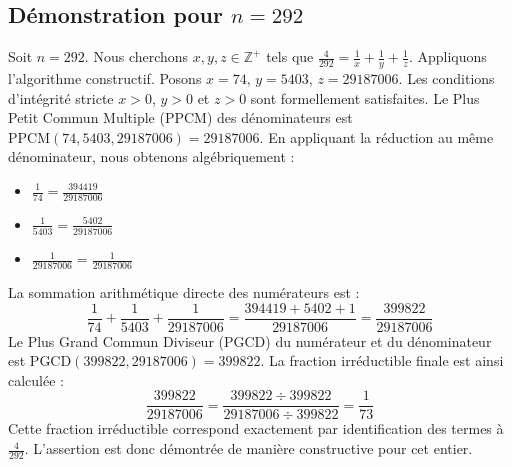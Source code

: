 \documentclass[11pt,a4paper]{article}
\begin{document}
\subsection{Démonstration pour $n = 292$}
Soit $n = 292$. Nous cherchons $x, y, z \in \mathbb{Z}^{+}$ tels que $\frac{4}{292} = \frac{1}{x} + \frac{1}{y} + \frac{1}{z}$.
Appliquons l'algorithme constructif. Posons $x = 74$, $y = 5403$, $z = 29187006$.
Les conditions d'intégrité stricte $x > 0$, $y > 0$ et $z > 0$ sont formellement satisfaites.
Le Plus Petit Commun Multiple (PPCM) des dénominateurs est $\text{PPCM}(74, 5403, 29187006) = 29187006$.
En appliquant la réduction au même dénominateur, nous obtenons algébriquement :
\begin{itemize}
    \item $\frac{1}{74} = \frac{394419}{29187006}$
    \item $\frac{1}{5403} = \frac{5402}{29187006}$
    \item $\frac{1}{29187006} = \frac{1}{29187006}$
\end{itemize}
La sommation arithmétique directe des numérateurs est :
$$ \frac{1}{74} + \frac{1}{5403} + \frac{1}{29187006} = \frac{394419 + 5402 + 1}{29187006} = \frac{399822}{29187006} $$
Le Plus Grand Commun Diviseur (PGCD) du numérateur et du dénominateur est $\text{PGCD}(399822, 29187006) = 399822$.
La fraction irréductible finale est ainsi calculée :
$$ \frac{399822}{29187006} = \frac{399822 \div 399822}{29187006 \div 399822} = \frac{1}{73} $$
Cette fraction irréductible correspond exactement par identification des termes à $\frac{4}{292}$. L'assertion est donc démontrée de manière constructive pour cet entier.
\end{document}
